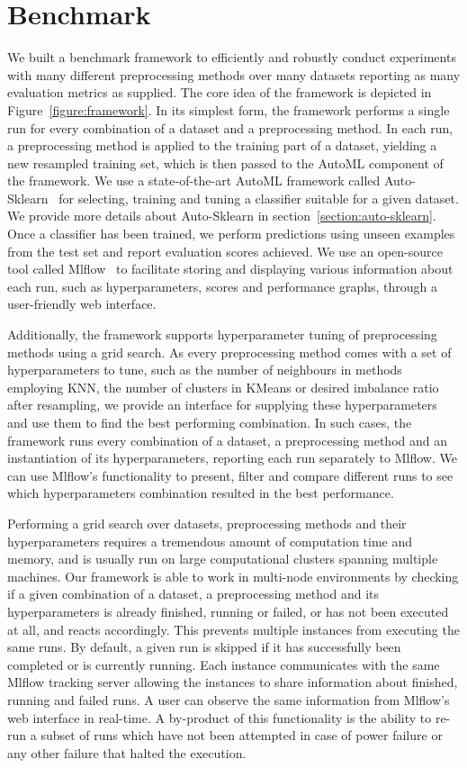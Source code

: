 \chapter{Benchmark}
\label{chapter:benchmark}

We built a benchmark framework to efficiently and robustly conduct experiments with many different
preprocessing methods over many datasets reporting as many evaluation metrics as supplied. The core
idea of the framework is depicted in Figure~\ref{figure:framework}. In its simplest form, the
framework performs a single run for every combination of a dataset and a preprocessing method. In
each run, a preprocessing method is applied to the training part of a dataset, yielding a new
resampled training set, which is then passed to the AutoML component of the framework. We use a
state-of-the-art AutoML framework called Auto-Sklearn~\cite{auto-sklearn-1.0} for selecting,
training and tuning a classifier suitable for a given dataset. We provide more details about
Auto-Sklearn in section~\ref{section:auto-sklearn}. Once a classifier has been trained, we perform
predictions using unseen examples from the test set and report evaluation scores achieved. We use
an open-source tool called Mlflow~\cite{mlflow} to facilitate storing and displaying various
information about each run, such as hyperparameters, scores and performance graphs, through a
user-friendly web interface.

Additionally, the framework supports hyperparameter tuning of preprocessing methods using a grid
search. As every preprocessing method comes with a set of hyperparameters to tune, such as the
number of neighbours in methods employing KNN, the number of clusters in KMeans or desired
imbalance ratio after resampling, we provide an interface for supplying these hyperparameters and
use them to find the best performing combination. In such cases, the framework runs every
combination of a dataset, a preprocessing method and an instantiation of its hyperparameters,
reporting each run separately to Mlflow. We can use Mlflow's functionality to present, filter and
compare different runs to see which hyperparameters combination resulted in the best performance.

Performing a grid search over datasets, preprocessing methods and their hyperparameters requires a
tremendous amount of computation time and memory, and is usually run on large computational
clusters spanning multiple machines. Our framework is able to work in multi-node environments by
checking if a given combination of a dataset, a preprocessing method and its hyperparameters is
already finished, running or failed, or has not been executed at all, and reacts accordingly. This
prevents multiple instances from executing the same runs. By default, a given run is skipped if it
has successfully been completed or is currently running. Each instance communicates with the same
Mlflow tracking server allowing the instances to share information about finished, running and
failed runs. A user can observe the same information from Mlflow's web interface in real-time. A
by-product of this functionality is the ability to re-run a subset of runs which have not been
attempted in case of power failure or any other failure that halted the execution.

